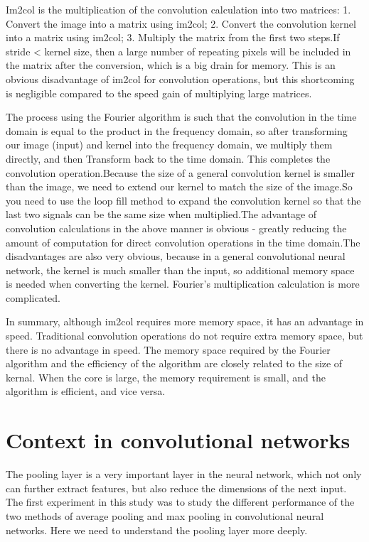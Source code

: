 \documentclass{article}
\begin{document}
Im2col is the multiplication of the convolution calculation into two matrices: 1. Convert the image into a matrix using im2col; 2. Convert the convolution kernel into a matrix using im2col; 3. Multiply the matrix from the first two steps.If stride < kernel size, then a large number of repeating pixels will be included in the matrix after the conversion, which is a big drain for memory. This is an obvious disadvantage of im2col for convolution operations, but this shortcoming is negligible compared to the speed gain of multiplying large matrices.

The process using the Fourier algorithm is such that the convolution in the time domain is equal to the product in the frequency domain, so after transforming our image (input) and kernel into the frequency domain, we multiply them directly, and then Transform back to the time domain. This completes the convolution operation.Because the size of a general convolution kernel is smaller than the image, we need to extend our kernel to match the size of the image.So you need to use the loop fill method to expand the convolution kernel so that the last two signals can be the same size when multiplied.The advantage of convolution calculations in the above manner is obvious - greatly reducing the amount of computation for direct convolution operations in the time domain.The disadvantages are also very obvious, because in a general convolutional neural network, the kernel is much smaller than the input, so additional memory space is needed when converting the kernel. Fourier's multiplication calculation is more complicated.

In summary, although im2col requires more memory space, it has an advantage in speed. Traditional convolution operations do not require extra memory space, but there is no advantage in speed. The memory space required by the Fourier algorithm and the efficiency of the algorithm are closely related to the size of kernal. When the core is large, the memory requirement is small, and the algorithm is efficient, and vice versa.

\section{Context in convolutional networks}

The pooling layer is a very important layer in the neural network, which not only can further extract features, but also reduce the dimensions of the next input. The first experiment in this study was to study the different performance of the two methods of average pooling and max pooling in convolutional neural networks. Here we need to understand the pooling layer more deeply.
\end{document}
